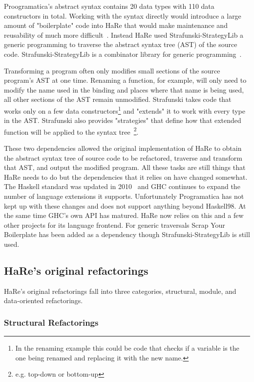 Proogramatica's abstract syntax contains 20 data types with 110 data constructors in total. Working with the syntax directly would introduce a large amount of "boilerplate" code into HaRe that would make maintenance and reusability of much more difficult~\citep{huiqingThesis}. Instead HaRe used Strafunski-StrategyLib a generic programming to traverse the abstract syntax tree (AST) of the source code. Strafunski-StrategyLib is a combinator library for generic programming~\citep{strafunski}. 

Transforming a program often only modifies small sections of the source program's AST at one time. Renaming a function, for example, will only need to modify the name used in the binding and places where that name is being used, all other sections of the AST remain unmodified. Strafunski takes code that works only on a few data constructors\footnote{In the renaming example this could be code that checks if a variable is the one being renamed and replacing it with the new name.} and "extends" it to work with every type in the AST. Strafunski also provides "strategies" that define how that extended function will be applied to the syntax tree~\citep{strafunski}\footnote{e.g. top-down or bottom-up}.

These two dependencies allowed the original implementation of HaRe to obtain the abstract syntax tree of source code to be refactored, traverse and transform that AST, and output the modified program. All these tasks are still things that HaRe needs to do but the dependencies that it relies on have changed somewhat. The Haskell standard was updated in 2010~\citep{haskell2010} and GHC continues to expand the number of language extensions it supports. Unfortunately Programatica has not kept up with these changes and does not support anything beyond Haskell98. At the same time GHC's own API has matured. HaRe now relies on this and a few other projects for its language frontend. For generic traversals Scrap Your Boilerplate has been added as a dependency though Strafunski-StrategyLib is still used.
 
\subsection{HaRe's original refactorings}\label{origRefactorings}

HaRe's original refactorings fall into three categories, structural, module, and data-oriented refactorings.

\subsubsection{Structural Refactorings}

